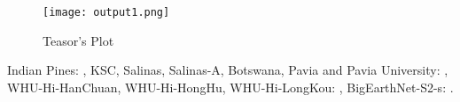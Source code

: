 \begin{figure}[htbp]
    \centering
    \texttt{[image: output1.png]}
    \caption{Teasor's Plot}
    \label{fig:tp}
\end{figure}

\newpage

Indian Pines: \cite{PURR1947}, KSC, Salinas, Salinas-A, Botswana, Pavia and Pavia University: \cite{pavia_datasets}, WHU-Hi-HanChuan, WHU-Hi-HongHu, WHU-Hi-LongKou: \cite{zhongMiniUAVborneHyperspectralRemote2018, huWHUhiUAVborneHyperspectral}, BigEarthNet-S2-s: \cite{clasen2024refinedbigearthnet, hackel2024configilm}.

\newpage